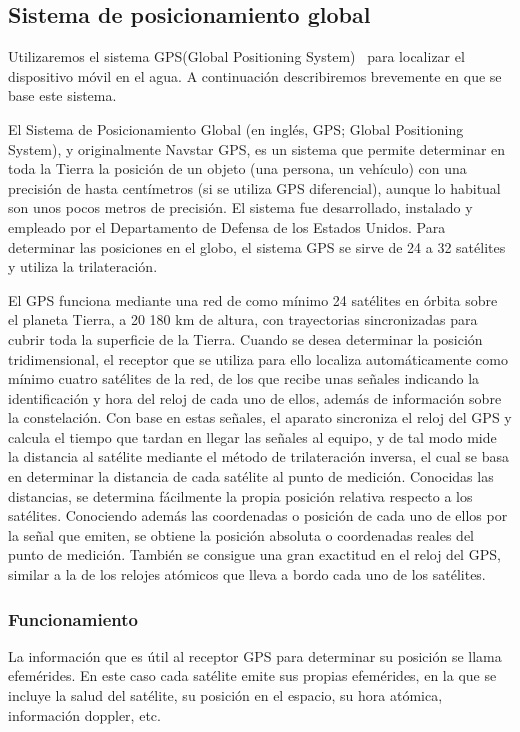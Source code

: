 \subsection{Sistema de posicionamiento global}
Utilizaremos el sistema GPS(Global Positioning System)~\cite{GPS} para localizar el dispositivo móvil en el
agua. A continuación describiremos brevemente en que se base este
sistema.

El Sistema de Posicionamiento Global (en inglés, GPS; Global
Positioning System), y originalmente Navstar GPS, es un sistema que
permite determinar en toda la Tierra la posición de un objeto (una
persona, un vehículo) con una precisión de hasta centímetros (si se
utiliza GPS diferencial), aunque lo habitual son unos pocos metros de
precisión. El sistema fue desarrollado, instalado y empleado por el
Departamento de Defensa de los Estados Unidos. Para determinar las
posiciones en el globo, el sistema GPS se sirve de 24 a 32 satélites y
utiliza la trilateración.

El GPS funciona mediante una red de como mínimo 24 satélites en
 órbita sobre el planeta Tierra, a 20 180 km de altura, con trayectorias 
sincronizadas para cubrir toda la superficie de la Tierra. Cuando
 se desea determinar la posición tridimensional, el receptor que se 
utiliza para ello localiza automáticamente como mínimo cuatro satélites 
de la red, de los que recibe unas señales indicando la identificación 
y hora del reloj de cada uno de ellos, además de información sobre 
la constelación. Con base en estas señales, el aparato sincroniza el 
reloj del GPS y calcula el tiempo que tardan en llegar las señales al 
equipo, y de tal modo mide la distancia al satélite mediante el método 
de trilateración inversa, el cual se basa en determinar la distancia
 de cada satélite al punto de medición. Conocidas las distancias, 
se determina fácilmente la propia posición relativa respecto a los
 satélites. Conociendo además las coordenadas o posición de cada
 uno de ellos por la señal que emiten, se obtiene la posición absoluta
 o coordenadas reales del punto de medición. También se consigue
 una gran exactitud en el reloj del GPS, similar a la de los relojes
 atómicos que lleva a bordo cada uno de los satélites.

\subsubsection{Funcionamiento}

La información que es útil al receptor GPS para determinar su
 posición se llama efemérides. En este caso cada satélite emite
 sus propias efemérides, en la que se incluye la salud del satélite, 
su posición en el espacio, su hora atómica, información doppler, etc.

